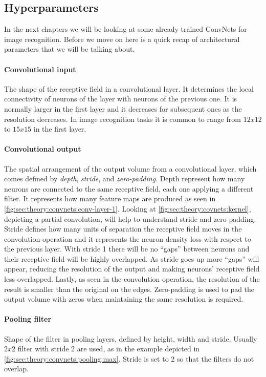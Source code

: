 \subsection{Hyperparameters}
\label{sub:theory:convnets:achitecture}

In the next chapters we will be looking at some already trained ConvNets for image recognition.
Before we move on here is a quick recap of architectural parameters that we will be talking about.

\paragraph{Convolutional input}
The shape of the receptive field in a convolutional layer.
It determines the local connectivity of neurons of the layer with neurons of the previous one.
It is normally larger in the first layer and it decreases for subsequent ones as the resolution decreases.
In image recognition tasks it is common to range from $12x12$ to $15x15$ in the first layer.

\paragraph{Convolutional output}
The spatial arrangement of the output volume from a convolutional layer, which comes defined by \emph{depth}, \emph{stride}, and \emph{zero-padding}.
Depth represent how many neurons are connected to the same receptive field, each one applying a different filter.
It represents how many feature maps are produced as seen in \autoref{fig:sec:theory:convnets:conv-layer-1}.
Looking at \autoref{fig:sec:theory:covnets:kernel}, depicting a partial convolution, will help to understand stride and zero-padding.
Stride defines how many units of separation the receptive field moves in the convolution operation and it represents the neuron density loss with respect to the previous layer.
With stride 1 there will be no ``gaps'' between neurons and their receptive field will be highly overlapped.
As stride goes up more ``gaps'' will appear, reducing the resolution of the output and making neurons' receptive field less overlapped.
Lastly, as seen in the convolution operation, the resolution of the result is smaller than the original on the edges.
Zero-padding is used to pad the output volume with zeros when maintaining the same resolution is required.

\paragraph{Pooling filter}
Shape of the filter in pooling layers, defined by height, width and stride.
Usually $2x2$ filter with stride 2 are used, as in the example depicted in \autoref{fig:sec:theory:convnets:pooling:max}.
Stride is set to 2 so that the filters do not overlap.


